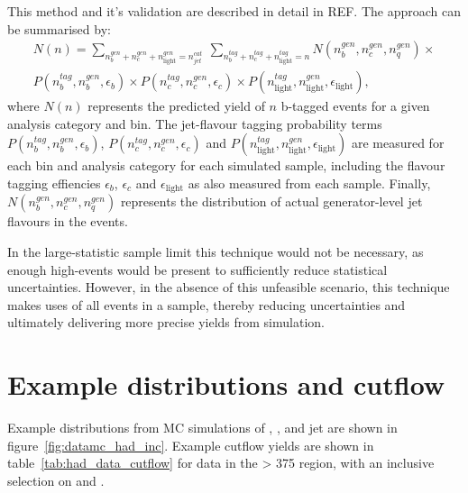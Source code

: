 This method and it's validation are described in detail in REF. The approach can
be summarised by:
% 
\begin{equation}
  \begin{split}
  N(n) = \sum_{n_b^{gen} + n_c^{gen} + n_{\text{light}}^{gen} = n_{jet}^{cat}}\:
  \sum_{n_b^{tag} + n_c^{tag} + n_{\text{light}}^{tag} = n}
  N(n_b^{gen}, n_c^{gen}, n_q^{gen}) \times \\
  P(n_b^{tag}, n_b^{gen}, \epsilon_{b}) \times
  P(n_c^{tag}, n_c^{gen}, \epsilon_{c}) \times
  P(n_{\text{light}}^{tag}, n_{\text{light}}^{gen}, \epsilon_{\text{light}}) ,
  \end{split}
\end{equation}
% 
where $N(n)$ represents the predicted yield of $n$ b-tagged events for a
given
analysis category and \HT bin. The jet-flavour tagging probability
terms $P(n_b^{tag}, n_b^{gen}, \epsilon_{b})$,
$P(n_c^{tag}, n_c^{gen}, \epsilon_{c})$ and 
$P(n_{\text{light}}^{tag}, n_{\text{light}}^{gen}, \epsilon_{\text{light}})$ are measured for each \HT bin and
analysis category for each simulated sample, including the flavour tagging
effiencies $\epsilon_b$, $\epsilon_c$ and $\epsilon_{\text{light}}$ as also measured from
each sample. Finally, $N(n_b^{gen}, n_c^{gen}, n_q^{gen})$ represents the
distribution of actual generator-level jet flavours in the events.

In the large-statistic sample limit this technique would not be necessary,
as enough high-\nb events would be present to sufficiently reduce statistical
uncertainties. However, in the absence of this unfeasible scenario,
this technique
makes uses of all events in a sample, thereby reducing uncertainties
and ultimately delivering more precise yields from simulation.


\section{Example distributions and cutflow}

Example distributions from MC simulations of \alphat, \HT, \mht and jet \Pt  are
shown in figure~\ref{fig:datamc_had_inc}. Example cutflow yields are shown in
table~\ref{tab:had_data_cutflow} for data in the \HT > 375 \gev region, with an
inclusive selection on \nj and \nb.


